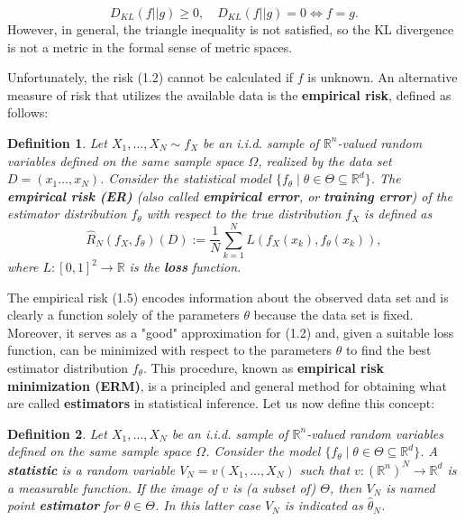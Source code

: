 \documentclass{report}
\newtheorem{definition}{Definition}[chapter]
\begin{document}
\begin{equation}
 D_{KL}(f||g) \geq 0, \quad D_{KL}(f||g) = 0 \iff f = g.
\end{equation}
However, in general, the triangle inequality is not satisfied, so the KL divergence is not a metric in the formal sense of metric spaces.

Unfortunately, the risk (1.2) cannot be calculated if $f$ is unknown. An alternative measure of risk that utilizes the available data is the \textbf{empirical risk}, defined as follows:

\begin{definition}
Let $X_1,\dots,X_N \sim f_X$ be an i.i.d. sample of $\mathbb{R}^n$-valued random variables defined on the same sample space $\Omega$, realized by the data set $D = (x_1\dots,x_N)$. Consider the statistical model $\{f_\theta \mid \theta \in \Theta \subseteq \mathbb{R}^d\}$. The \textbf{empirical risk (ER)} (also called \textbf{empirical error}, or \textbf{training error}) of the estimator distribution $f_\theta$ with respect to the true distribution $f_X$ is defined as
\begin{equation}
\hat{R}_N(f_X,f_\theta)(D) := \frac{1}{N}\sum_{k=1}^{N}L(f_X(x_k),f_\theta(x_k)),
\end{equation}
where $L : [0,1]^2 \to \mathbb{R}$ is the \textbf{loss} function.
\end{definition}

The empirical risk (1.5) encodes information about the observed data set and is clearly a function solely of the parameters $\theta$ because the data set is fixed. Moreover, it serves as a "good" approximation for (1.2) and, given a suitable loss function, can be minimized with respect to the parameters $\theta$ to find the best estimator distribution $f_\theta$. This procedure, known as \textbf{empirical risk minimization (ERM)}, is a principled and general method for obtaining what are called \textbf{estimators} in statistical inference. Let us now define this concept:

\begin{definition}
Let $X_1,\dots,X_N$ be an i.i.d. sample of $\mathbb{R}^n$-valued random variables defined on the same sample space $\Omega$. Consider the model $\{f_\theta \mid \theta \in \Theta \subseteq \mathbb{R}^d \}$. A \textbf{statistic} is a random variable $V_N = v(X_1,\dots,X_N)$ such that $v : (\mathbb{R}^n)^N \to \mathbb{R}^d$ is a measurable function. If the image of $v$ is (a subset of) $\Theta$, then $V_N$ is named point \textbf{estimator} for $\theta \in \Theta$. In this latter case $V_N$ is indicated as $\hat{\theta}_N$.
\end{definition}
\end{document}
